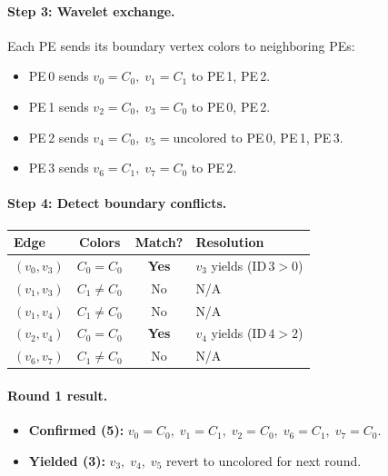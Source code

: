 \documentclass[11pt,letterpaper]{article}
\begin{document}
\paragraph{Step 3: Wavelet exchange.}
Each PE sends its boundary vertex colors to neighboring PEs:
\begin{itemize}[nosep]
  \item PE\,0 sends $v_0{=}C_0,\; v_1{=}C_1$ to PE\,1, PE\,2.
  \item PE\,1 sends $v_2{=}C_0,\; v_3{=}C_0$ to PE\,0, PE\,2.
  \item PE\,2 sends $v_4{=}C_0,\; v_5{=}\text{uncolored}$ to PE\,0, PE\,1, PE\,3.
  \item PE\,3 sends $v_6{=}C_1,\; v_7{=}C_0$ to PE\,2.
\end{itemize}

\paragraph{Step 4: Detect boundary conflicts.}
\begin{center}
\begin{tabular}{lccl}
\toprule
Edge & Colors & Match? & Resolution \\
\midrule
$(v_0,v_3)$ & $C_0 = C_0$ & \textcolor{conflictRed}{\textbf{Yes}} & $v_3$ yields (ID\,$3>0$) \\
$(v_1,v_3)$ & $C_1 \neq C_0$ & \textcolor{confirmGreen}{No} & N/A \\
$(v_1,v_4)$ & $C_1 \neq C_0$ & \textcolor{confirmGreen}{No} & N/A \\
$(v_2,v_4)$ & $C_0 = C_0$ & \textcolor{conflictRed}{\textbf{Yes}} & $v_4$ yields (ID\,$4>2$) \\
$(v_6,v_7)$ & $C_1 \neq C_0$ & \textcolor{confirmGreen}{No} & N/A \\
\bottomrule
\end{tabular}
\end{center}

\paragraph{Round 1 result.}
\begin{itemize}[nosep]
  \item \textcolor{confirmGreen}{\textbf{Confirmed (5):}} $v_0{=}C_0,\; v_1{=}C_1,\; v_2{=}C_0,\; v_6{=}C_1,\; v_7{=}C_0$.
  \item \textcolor{conflictRed}{\textbf{Yielded (3):}} $v_3,\; v_4,\; v_5$ revert to uncolored for next round.
\end{itemize}
\end{document}
